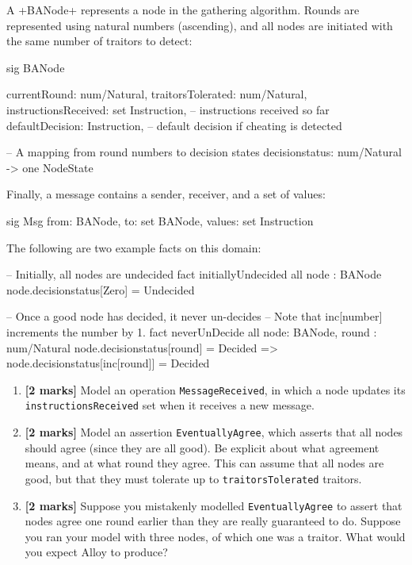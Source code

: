 A \A+BANode+ represents a node in the gathering algorithm. Rounds are represented using natural numbers (ascending), and all nodes are initiated with the same number of traitors to detect:

\begin{alloy}
sig BANode {
   currentRound: num/Natural,
   traitorsTolerated: num/Natural,
   instructionsReceived: set Instruction, -- instructions received so far
   defaultDecision: Instruction,          -- default decision if cheating is detected

   -- A mapping from round numbers to decision states
   decisionstatus: num/Natural -> one NodeState
}
\end{alloy}

Finally, a message contains a sender, receiver, and a set of values:

\begin{alloy}
sig Msg {
   from: BANode,
   to: set BANode,
   values: set Instruction
}
\end{alloy}

The following are two example facts on this domain:

\begin{alloy}
-- Initially, all nodes are undecided 
fact initiallyUndecided {
   all node : BANode {
      node.decisionstatus[Zero] = Undecided
   }
}

-- Once a good node has decided, it never un-decides
-- Note that inc[number] increments the number by 1.
fact neverUnDecide {
   all node: BANode, round : num/Natural {
      node.decisionstatus[round] = Decided => 
         node.decisionstatus[inc[round]] = Decided
   }
}
\end{alloy}


\begin{enumerate}

 \item \textbf{[2 marks]} Model an operation \texttt{MessageReceived}, in which a node updates its \texttt{instructionsReceived} set when it receives a new message.

 \item \textbf{[2 marks]} Model an assertion \texttt{EventuallyAgree}, which asserts that all nodes should agree (since they are all good).  Be explicit about what agreement means, and at what round
 they agree.  This can  assume that all nodes are good, but that they must tolerate up to \texttt{traitorsTolerated} traitors. 

 \item \textbf{[2 marks]} Suppose you mistakenly modelled \texttt{EventuallyAgree} to assert that nodes agree one round earlier than they are really guaranteed to do.  Suppose you ran your model with three nodes, of which one was a traitor.  What would you expect Alloy to produce?  

\end{enumerate}

